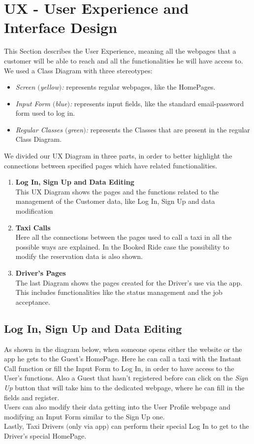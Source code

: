 \section{UX - User Experience and Interface Design}

This Section describes the User Experience, meaning all the webpages that a customer will be able to reach and all the functionalities he will have access to.
\newline
We used a Class Diagram with three stereotypes:
\begin {itemize}
\item \textit{Screen $($yellow$)$:} represents regular webpages, like the HomePages.
\item \textit{Input Form $($blue$)$:} represents input fields, like the standard email-password form used to log in.
\item \textit{Regular Classes $($green$)$:} represents the Classes that are present in the regular Class Diagram.
\end {itemize} 
\hfill
\hfill

We divided our UX Diagram in three parts, in order to better highlight the connections between specified pages which have related functionalities.
\begin{enumerate}
\item \textbf{Log In, Sign Up and Data Editing}\\
	This UX Diagram shows the pages and the functions related to the management of the Customer data, like Log In, Sign Up and data modification
\item \textbf{Taxi Calls}\\
	Here all the connections between the pages used to call a taxi in all the possible ways are explained. 
	In the Booked Ride case the possibility to modify the reservation data is also shown.
\item \textbf{Driver's Pages}\\ 
	The last Diagram shows the pages created for the Driver's use via the app. 
	This includes functionalities like the status management and the job acceptance.
	
\end{enumerate}
\newpage

\subsection{Log In, Sign Up and Data Editing}
As shown in the diagram below, when someone opens either the website or the app he gets to the Guest's HomePage. Here he can call a taxi with the Instant Call function or fill the Input Form to Log In, in order to have access to the User's functions. Also a Guest that hasn't registered before can click on the \textit{Sign Up} button that will take him to the dedicated webpage, where he can fill in the fields and register.\\
Users can also modify their data getting into the User Profile webpage and modifying an Input Form similar to the Sign Up one. \\
Lastly, Taxi Drivers $($only via app$)$ can perform their special Log In to get to the Driver's special HomePage. 

